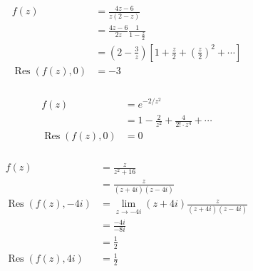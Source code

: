 \documentclass{article}
\newcommand{\Res}{\operatorname{Res}}
\begin{document}
\setcounter{subsubsection}{2}
\subsubsection{}

\begin{align*}
  f(z)          & = \frac{4 z - 6}{z (2 - z)}                                                                             \\
                & = \frac{4 z - 6}{2 z} \frac{1}{1 - \frac{z}{2}}                                                         \\
                & = \left( 2 - \frac{3}{z} \right) \left[ 1 + \frac{z}{2} + \left( \frac{z}{2} \right)^2 + \cdots \right] \\
  \Res(f(z), 0) & = -3
\end{align*}

\setcounter{subsubsection}{4}
\subsubsection{}

\begin{align*}
  f(z)          & = e^{-2 / z^2}                                        \\
                & = 1 - \frac{2}{z^2} + \frac{4}{2! \cdot z^4} + \cdots \\
  \Res(f(z), 0) & = 0
\end{align*}

\setcounter{subsubsection}{6}
\subsubsection{}

\begin{align*}
  f(z)             & = \frac{z}{z^2 + 16}                                                \\
                   & = \frac{z}{(z + 4 i) (z - 4 i)}                                     \\
  \Res(f(z), -4 i) & = \lim_{z \rightarrow -4 i} (z + 4 i) \frac{z}{(z + 4 i) (z - 4 i)} \\
                   & = \frac{-4 i}{-8 i}                                                 \\
                   & = \frac{1}{2}                                                       \\
  \Res(f(z), 4 i)  & = \frac{1}{2}
\end{align*}
\end{document}
